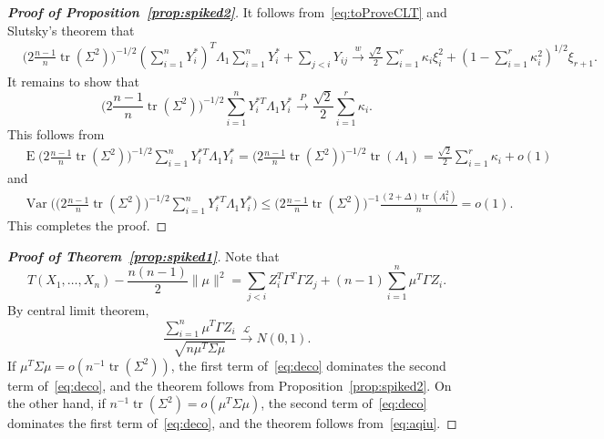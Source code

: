 \documentclass[3p]{elsarticle}
\DeclareMathOperator{\mytr}{tr}
\DeclareMathOperator{\myE}{E}
\DeclareMathOperator{\myVar}{Var}
\theoremstyle{plain}
\theoremstyle{definition}
\theoremstyle{remark}
\begin{document}
\begin{proof}[\textbf{Proof of Proposition~\ref{prop:spiked2}}]
    

    It follows from~\eqref{eq:toProveCLT} and Slutsky's theorem that
    $$
    \begin{aligned}
        &\big(2\frac{n-1}{n}\mytr(\Sigma^2)\big)^{-1/2}(\sum_{i=1}^n  Y_i^*)^T \Lambda_1 \sum_{i=1}^n  Y_i^*
        +
        \sum_{j<i} Y_{ij}
        \xrightarrow{w} \frac{\sqrt{2}}{2}\sum_{i=1}^r \kappa_i \xi_i^2+ (1-\sum_{i=1}^r \kappa_i^2)^{1/2}\xi_{r+1}.
    \end{aligned}
    $$
    It remains to show that
        $$
        \big(2\frac{n-1}{n}\mytr(\Sigma^2)\big)^{-1/2}
        \sum_{i=1}^n Y_i^{*T}\Lambda_1 Y_i^*
      \xrightarrow{P}\frac{\sqrt{2}}{2}\sum_{i=1}^r \kappa_i.
        $$
        This follows from
        $$
        \begin{aligned}
            &\myE
        \big(2\frac{n-1}{n}\mytr(\Sigma^2)\big)^{-1/2}
        \sum_{i=1}^n Y_i^{*T}\Lambda_1 Y_i^*
            =
        \big(2\frac{n-1}{n}\mytr(\Sigma^2)\big)^{-1/2}\mytr(\Lambda_1)
            =\frac{\sqrt{2}}{2}\sum_{i=1}^r \kappa_i+o(1)
        \end{aligned}
        $$
        and
        $$
        \begin{aligned}
            &\myVar\Big(
        \big(2\frac{n-1}{n}\mytr(\Sigma^2)\big)^{-1/2}
        \sum_{i=1}^n Y_i^{*T}\Lambda_1 Y_i^*
            \Big)
            \leq \big(2\frac{n-1}{n}\mytr(\Sigma^2)\big)^{-1} \frac{(2+\Delta)\mytr(\Lambda_1^2)}{n}=o(1).
        \end{aligned}
        $$
        This completes the proof.
    
\end{proof}


\begin{proof}[\textbf{Proof of Theorem~\ref{prop:spiked1}}]
    Note that
    \begin{equation}\label{eq:deco}
        {T(X_1,\ldots,X_n)-\frac{n(n-1)}{2}\|\mu\|^2}
    =
        {\sum_{j<i} Z_i^T \Gamma^T \Gamma Z_j}
    +
        {(n-1) \sum_{i=1}^n \mu^T \Gamma Z_i}.
    \end{equation}
    By central limit theorem,
        \begin{equation}\label{eq:aqiu}
        \frac{ \sum_{i=1}^n \mu^T \Gamma Z_i}
        {\sqrt{n\mu^T \Sigma \mu}}
        \xrightarrow{\mathcal{L}}N(0,1).
        \end{equation}
    If $\mu^T \Sigma \mu=o(n^{-1}\mytr(\Sigma^2))$, the first term of~\eqref{eq:deco} dominates the second term of~\eqref{eq:deco}, and the theorem follows from Proposition~\ref{prop:spiked2}.
    On the other hand, if $n^{-1}\mytr(\Sigma^2)=o(\mu^T \Sigma \mu)$, the second term of~\eqref{eq:deco} dominates the first term of~\eqref{eq:deco}, and the theorem follows from~\eqref{eq:aqiu}.



\end{proof}
\end{document}
